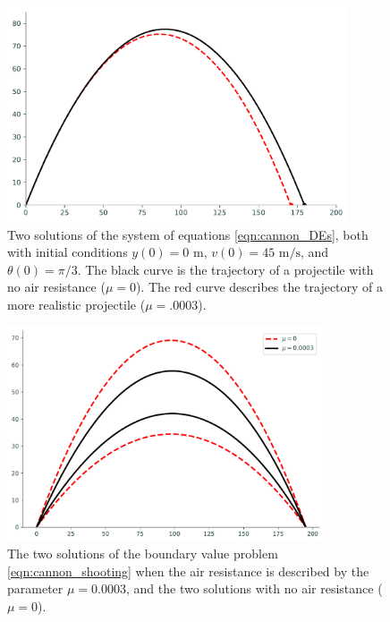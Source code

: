 \begin{figure}[H]
\includegraphics[height=2.5in]{figures/cannon_comparison.pdf}
\caption{Two solutions of the system of equations \eqref{eqn:cannon_DEs}, both with initial conditions  $y(0) = 0 \text{ m}$, $ v(0) = 45 \text{ m/s}$, and $\theta(0)=\pi/3$.
The black curve is the trajectory of a projectile with no air resistance ($\mu = 0$).
The red curve describes the trajectory of a more realistic projectile ($\mu = .0003$).}
\label{fig:shooting_cannon_comparison1}
\end{figure}

\begin{figure}[H]
\includegraphics[height=2.5in]{figures/problem3.pdf}
\caption{The two solutions of the boundary value problem \eqref{eqn:cannon_shooting} when the air resistance is described by the parameter $\mu = 0.0003$,
and the two solutions with no air resistance ($\mu = 0$).}
\label{fig:shooting_cannon_comparison2}
\end{figure} 